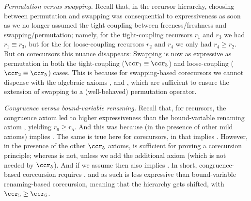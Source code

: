 \emph{Permutation versus swapping.} Recall that, in the recursor hierarchy, choosing between permutation and swapping 
was %
consequential to expressiveness as soon as we no longer assumed   %
the tight coupling between freeness/freshness and swapping/permutation; namely, for the tight-coupling recursors $r_1$ and $r_3$ we had $r_1 \equiv r_3$, 
but for the for loose-coupling recursors $r_2$ and $r_4$
we only had $r_4 \geq r_2$.  
%
But %
on corecursors this nuance disappears: Swapping is now as expressive as permutation in both the 
tight-coupling %
($\ccr_1 \equiv \ccr_3$) 
and loose-coupling ($\ccr_{2} \equiv \ccr_{5}$) cases. This is because for swapping-based corecursors we cannot dispense with 
the algebraic axioms \ISwId{}, 
\ISwIv{} and \ISwCp{}, which %
are sufficient to ensure the extension of swapping %
to a (well-behaved) permutation operator.  

\emph{Congruence versus bound-variable renaming.} Recall that, for recursors, the congruence axiom \SwCg{} led to higher expressiveness than the bound-variable renaming axiom \SwBvr{}, yielding $r_6 \geq r_5$.
And this was because (in the presence of 
other mild axioms) \SwBvr{} implies \SwCg{}. 
The same is true here for corecursors, in that \ISwBvr{} %
implies \ISwCg{}. However, in the presence of the other $\ccr_{5}$ axioms, \ISwBvr{} is sufficient for proving a corecursion principle; whereas \ISwCg{} is not, unless we add the additional axiom \IFrSw{} (which is not needed by $\ccr_{5}$). %
And if we assume \IFrSw{} then 
\ISwCg{} also implies \ISwBvr{}. In short, congruence-based corecursion requires \IFrSw{}, and as such is less expressive than 
bound-variable renaming-based corecursion, meaning that the hierarchy gets shifted, with $\ccr_{5} \geq \ccr_{6} $.


